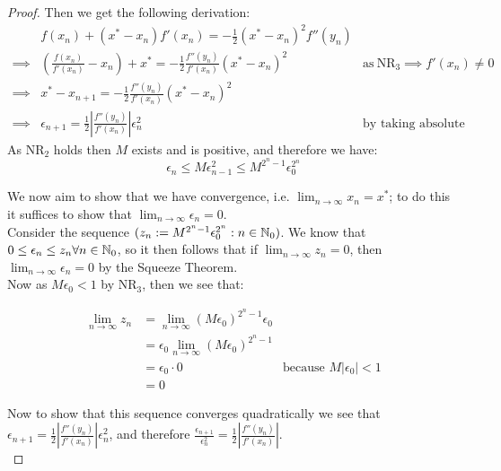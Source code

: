 \begin{Uniform Convergence Thm}
\begin{proof}
Then we get the following derivation:
\begin{displaymath}
\begin{align*}
	&f(x_n) + (x^\ast - x_n)f'(x_n) = 
		-\tfrac{1}{2}(x^\ast - x_n)^2f''(y_n)\\
	\implies &\left(\frac{f(x_n)}{f'(x_n)} - x_n\right) + x^\ast =
		-\frac{1}{2}\frac{f''(y_n)}{f'(x_n)}(x^\ast - x_n)^2
		&\textrm{as} \ \textrm{NR}_3 \implies f'(x_n) \neq 0\\
	\implies &x^\ast - x_{n+1} = 
		-\frac{1}{2}\frac{f''(y_n)}{f'(x_n)}(x^\ast - x_n)^2\\
	\implies &\epsilon_{n+1} =
		\frac{1}{2}\left|\frac{f''(y_n)}{f'(x_n)}\right|\epsilon_n^2
		&\textrm{by taking absolute values}
\end{align*}
\end{displaymath}
As \(\textrm{NR}_2\) holds then \(M\) exists and is positive, and therefore we have:
\[\epsilon_n \le M\epsilon_{n-1}^2 \le M^{2^n - 1}\epsilon_0^{2^n}\]

We now aim to show that we have convergence, i.e. \(\lim_{n \to \infty} x_n = x^\ast\); to do this it suffices to show that \(\lim_{n\to\infty}\epsilon_n = 0\).\\

Consider the sequence \((z_n := M^{2^n - 1}\epsilon_0^{2^n} : n \in \mathbb{N}_0)\). We know that \(0 \le \epsilon_n \le z_n \forall n \in \mathbb{N}_0\), so it then follows that if \(\lim_{n \to \infty}z_n = 0\), then \(\lim_{n \to \infty}\epsilon_n = 0\) by the Squeeze Theorem\cite[][909]{BOK_Squeeze}.\\

Now as \(M\epsilon_0 < 1\) by \(\textrm{NR}_3\), then we see that:

\begin{displaymath}
\begin{align*}
\lim_{n\to\infty}z_n 
	&= \lim_{n\to\infty}(M\epsilon_0)^{2^n - 1}\epsilon_0\\ 
	&= \epsilon_0\lim_{n\to\infty}(M\epsilon_0)^{2^n - 1}\\
	&= \epsilon_0\cdot0
		&\textrm{because \(M|\epsilon_0| < 1\)}\\
	&= 0
\end{align*}
\end{displaymath}

Now to show that this sequence converges quadratically we see that \(\epsilon_{n+1} = \frac{1}{2}\left|\frac{f''(y_n)}{f'(x_n)}\right|\epsilon_n^2\), and therefore \(\frac{\epsilon_{n+1}}{\epsilon_n^2} = \frac{1}{2}\left|\frac{f''(y_n)}{f'(x_n)}\right|\).\\


\end{proof}
\end{Uniform Convergence Thm}
